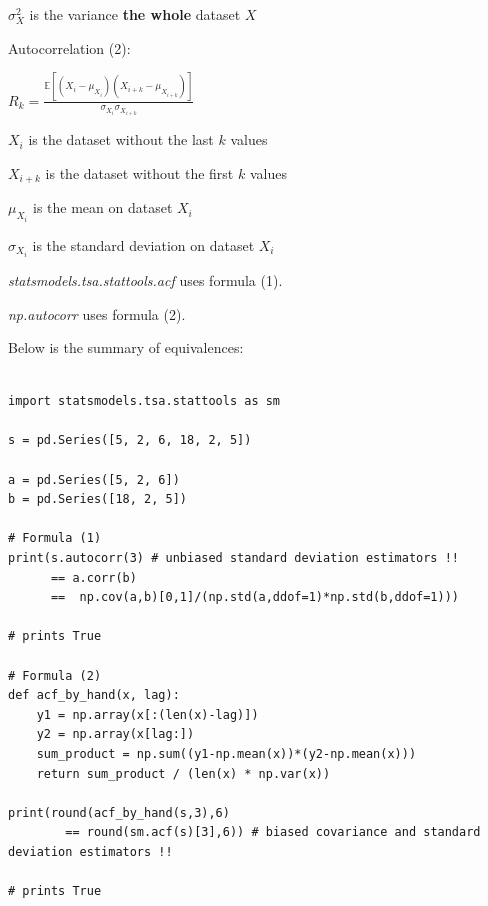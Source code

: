 $\sigma_X^2$ is the variance \textbf{the whole} dataset $X$

\vspace{5mm}

Autocorrelation (2):

\begin{center}
$R_{k} = \frac{\mathbb{E}[(X_i-\mu_{X_i})(X_{i+k}-\mu_{X_{i+k}})]}{\sigma_{X_i}\sigma_{X_{i+k}}}$
\end{center}

$X_i$ is the dataset without the last $k$ values

$X_{i+k}$ is the dataset without the first $k$ values

$\mu_{X_i}$ is the mean on dataset $X_i$

$\sigma_{X_i}$ is the standard deviation on dataset $X_i$

\vspace{5mm}

\textit{statsmodels.tsa.stattools.acf} uses formula (1).

\textit{np.autocorr} uses formula (2).

Below is the summary of equivalences:

\lstset{language=Python}
\lstset{frame=lines}
\lstset{basicstyle=\footnotesize}
\begin{lstlisting}

import statsmodels.tsa.stattools as sm

s = pd.Series([5, 2, 6, 18, 2, 5])

a = pd.Series([5, 2, 6])
b = pd.Series([18, 2, 5])

# Formula (1)
print(s.autocorr(3) # unbiased standard deviation estimators !!
      == a.corr(b)
      ==  np.cov(a,b)[0,1]/(np.std(a,ddof=1)*np.std(b,ddof=1)))

# prints True

# Formula (2)
def acf_by_hand(x, lag):
    y1 = np.array(x[:(len(x)-lag)])
    y2 = np.array(x[lag:])
    sum_product = np.sum((y1-np.mean(x))*(y2-np.mean(x)))
    return sum_product / (len(x) * np.var(x))

print(round(acf_by_hand(s,3),6)
        == round(sm.acf(s)[3],6)) # biased covariance and standard deviation estimators !!

# prints True

\end{lstlisting}

\vspace{5mm}


